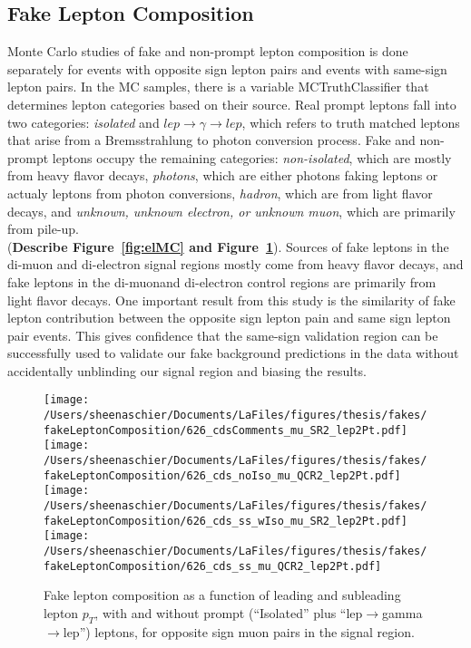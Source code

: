   \FloatBarrier
  \subsection{Fake Lepton Composition}
 Monte Carlo studies of fake and non-prompt lepton composition is done separately for events with opposite sign lepton pairs and events with same-sign lepton pairs.  In the MC samples, there is a variable MCTruthClassifier that determines lepton categories based on their source.  Real prompt leptons fall into two categories: \textit{isolated} and $lep\rightarrow \gamma \rightarrow lep$, which refers to truth matched leptons that arise from a Bremsstrahlung to photon conversion process. Fake and non-prompt leptons occupy the remaining categories: \textit{non-isolated}, which are mostly from heavy flavor decays, \textit{photons}, which are either photons faking leptons or actualy leptons from photon conversions, \textit{hadron}, which are from light flavor decays, and \textit{unknown, unknown electron, or unknown muon}, which are primarily from pile-up.\\
(\textbf{Describe Figure~\ref{fig:elMC} and Figure~\ref{fig:muMC}}). Sources of fake leptons in the di-muon and di-electron signal regions mostly come from heavy flavor decays, and fake leptons in the  di-muonand di-electron control regions are primarily from light flavor decays.  One important result from this study is the similarity of fake lepton contribution between the opposite sign lepton pain and same sign lepton pair events.  This gives confidence that the same-sign validation region can be successfully used to validate our fake background predictions in the data without accidentally unblinding our signal region and biasing the results.  

  
\begin{figure}[htb]
        \centering
        \texttt{[image: /Users/sheenaschier/Documents/LaFiles/figures/thesis/fakes/fakeLeptonComposition/626\_cdsComments\_mu\_SR2\_lep2Pt.pdf]}
       \texttt{[image: /Users/sheenaschier/Documents/LaFiles/figures/thesis/fakes/fakeLeptonComposition/626\_cds\_noIso\_mu\_QCR2\_lep2Pt.pdf]}
      \texttt{[image: /Users/sheenaschier/Documents/LaFiles/figures/thesis/fakes/fakeLeptonComposition/626\_cds\_ss\_wIso\_mu\_SR2\_lep2Pt.pdf]}
        \texttt{[image: /Users/sheenaschier/Documents/LaFiles/figures/thesis/fakes/fakeLeptonComposition/626\_cds\_ss\_mu\_QCR2\_lep2Pt.pdf]}
        \caption{Fake lepton composition as a function of leading and subleading lepton $p_{T}$, with and without prompt (``Isolated'' plus ``lep$\to$gamma$\to$lep'') leptons, for opposite sign muon pairs in the signal region.}
        \label{fig:muMC}
\end{figure}

